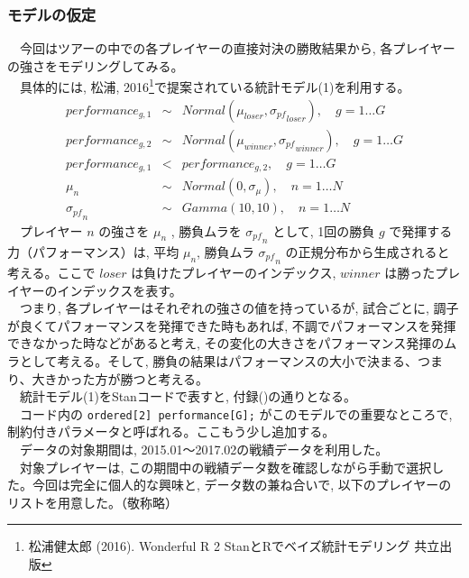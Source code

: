 \documentclass[uplatex,9pt,a5j]{jsarticle}
\begin{document}
\subsubsection{モデルの仮定}
　今回はツアーの中での各プレイヤーの直接対決の勝敗結果から, 各プレイヤーの強さをモデリングしてみる。\\
　具体的には, 松浦, 2016\footnote{松浦健太郎 (2016). Wonderful R 2 StanとRでベイズ統計モデリング 共立出版}で提案されている統計モデル(1)を利用する。\\
\begin{eqnarray}
  performance_{g,1} & {\sim} & Normal(\mu_{loser}, {\sigma_{pf}}_{loser}), \hspace{1em} g=1{\ldots}G \nonumber \\
  performance_{g,2} & {\sim} & Normal(\mu_{winner}, {\sigma_{pf}}_{winner}), \hspace{1em} g=1{\ldots}G \nonumber \\
  performance_{g,1} & < & performance_{g,2}, \hspace{1em} g=1{\ldots}G \\
  \mu_n & {\sim} & Normal(0,\sigma_{\mu}), \hspace{1em} n=1{\ldots}N \nonumber \\
  {\sigma_{pf}}_n & {\sim} & Gamma(10,10), \hspace{1em} n=1{\ldots}N \nonumber
  \label{eq:eq_model_strength}
\end{eqnarray}
　プレイヤー $n$ の強さを $\mu_n$ , 勝負ムラを ${\sigma_{pf}}_n$ として, 1回の勝負 $g$ で発揮する力（パフォーマンス）は, 平均 $\mu_n$, 勝負ムラ ${\sigma_{pf}}_n$ の正規分布から生成されると考える。ここで $loser$ は負けたプレイヤーのインデックス, $winner$ は勝ったプレイヤーのインデックスを表す。\\
　つまり, 各プレイヤーはそれぞれの強さの値を持っているが, 試合ごとに, 調子が良くてパフォーマンスを発揮できた時もあれば, 不調でパフォーマンスを発揮できなかった時などがあると考え, その変化の大きさをパフォーマンス発揮のムラとして考える。そして, 勝負の結果はパフォーマンスの大小で決まる、つまり、大きかった方が勝つと考える。\\
　統計モデル(1)をStanコードで表すと, 付録()の通りとなる。\\
　コード内の \verb|ordered[2] performance[G];| がこのモデルでの重要なところで, 制約付きパラメータと呼ばれる。ここもう少し追加する。\\
　データの対象期間は, 2015.01〜2017.02の戦績データを利用した。\\
　対象プレイヤーは, この期間中の戦績データ数を確認しながら手動で選択した。今回は完全に個人的な興味と, データ数の兼ね合いで, 以下のプレイヤーのリストを用意した。（敬称略）\\
\end{document}
